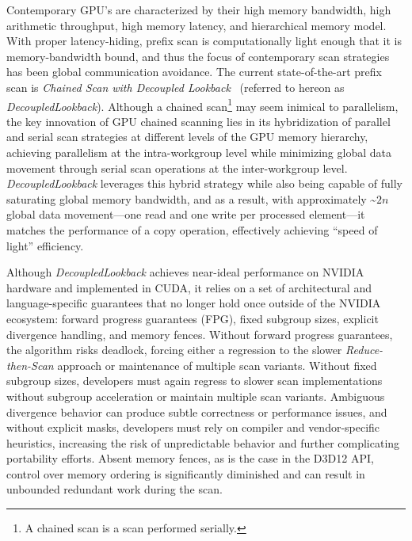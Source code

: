 \documentclass[sigconf]{acmart}
\begin{document}
Contemporary GPU's are characterized by their high memory bandwidth, high arithmetic throughput, high memory latency, and hierarchical memory model. With proper latency-hiding, prefix scan is computationally light enough that it is memory-bandwidth bound, and thus the focus of contemporary scan strategies has been global communication avoidance. The current state-of-the-art prefix scan is \emph{Chained Scan with Decoupled Lookback}~\cite{Merrill2016} (referred to hereon as \emph{DecoupledLookback}). Although a chained scan\footnote{A chained scan is a scan performed serially.} may seem inimical to parallelism, the key innovation of GPU chained scanning lies in its hybridization of parallel and serial scan strategies at different levels of the GPU memory hierarchy, achieving parallelism at the intra-workgroup level while minimizing global data movement through serial scan operations at the inter-workgroup level. \emph{DecoupledLookback} leverages this hybrid strategy while also being capable of fully saturating global memory bandwidth, and as a result, with approximately \textasciitilde$2n$ global data movement—one read and one write per processed element—it matches the performance of a copy operation, effectively achieving “speed of light” efficiency.

Although \emph{DecoupledLookback} achieves near-ideal performance on NVIDIA hardware and implemented in CUDA, it relies on a set of architectural and language-specific guarantees that no longer hold once outside of the NVIDIA ecosystem: forward progress guarantees (FPG), fixed subgroup sizes, explicit divergence handling, and memory fences. Without forward progress guarantees, the algorithm risks deadlock, forcing either a regression to the slower \emph{Reduce-then-Scan} approach or maintenance of multiple scan variants. Without fixed subgroup sizes, developers must again regress to slower scan implementations without subgroup acceleration or maintain multiple scan variants. Ambiguous divergence behavior can produce subtle correctness or performance issues, and without explicit masks, developers must rely on compiler and vendor-specific heuristics, increasing the risk of unpredictable behavior and further complicating portability efforts. Absent memory fences, as is the case in the D3D12 API, control over memory ordering is significantly diminished and can result in unbounded redundant work during the scan.
\end{document}
